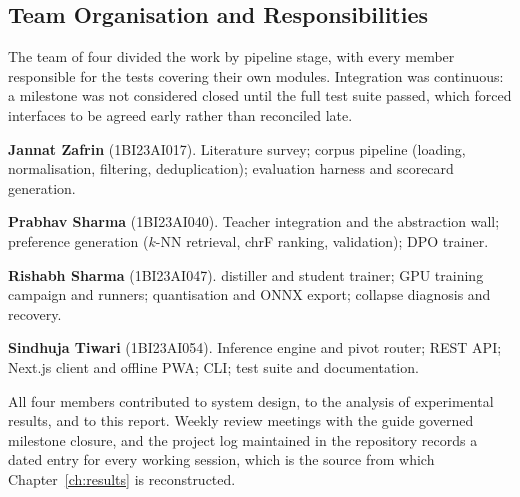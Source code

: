 \subsection{Team Organisation and Responsibilities}
\label{subsec:team}

The team of four divided the work by pipeline stage, with every member
responsible for the tests covering their own modules. Integration was
continuous: a milestone was not considered closed until the full test suite
passed, which forced interfaces to be agreed early rather than reconciled late.

\begin{bullets}
\item \textbf{Jannat Zafrin} (1BI23AI017). Literature survey; corpus pipeline (loading, normalisation, filtering, deduplication); evaluation harness and scorecard generation.
\item \textbf{Prabhav Sharma} (1BI23AI040). Teacher integration and the abstraction wall; preference generation ($k$-NN retrieval, chrF ranking, validation); DPO trainer.
\item \textbf{Rishabh Sharma} (1BI23AI047). \seqkd{} distiller and student trainer; GPU training campaign and runners; quantisation and ONNX export; collapse diagnosis and recovery.
\item \textbf{Sindhuja Tiwari} (1BI23AI054). Inference engine and pivot router; REST API; Next.js client and offline PWA; CLI; test suite and documentation.
\end{bullets}

All four members contributed to system design, to the analysis of experimental
results, and to this report. Weekly review meetings with the guide governed
milestone closure, and the project log maintained in the repository records a
dated entry for every working session, which is the source from which
Chapter~\ref{ch:results} is reconstructed.
